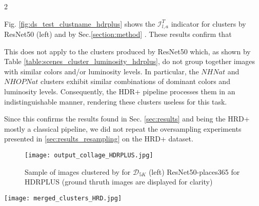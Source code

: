 \documentclass[12pt]{spieman}  %
\begin{document}
\begin{spacing}{2}
\begin{linenumbers}
Fig. \ref{fig:ds_test_clustname_hdrplus}  {shows the $\mathcal{I}^T_{l,a}$ indicator for clusters by ResNet50 (left) and by }  Sec.\ref{section:method}   {. These results confirm that} 

 {This does not apply to the clusters produced by ResNet50 which, as shown by Table } \ref{table:scenes_cluster_luminosity_hdrplus},  { do not group together images with similar colors and/or luminosity levels. In particular,  the $NHNat$ and $NHOPNat$ clusters exhibit similar combinations of dominant colors and luminosity levels. Consequently, the HDR+ pipeline processes them in an indistinguishable manner, rendering these clusters useless for this task.}



 {Since this confirms the results found in Sec.} \ref{sec:results} {and being the HRD+  mostly a classical pipeline, we did not repeat the oversampling experiments presented in} \ref{sec:results_resampling}  {on the HRD+ dataset.}


\begin{figure}[!t]
	\centering
	\texttt{[image: output\_collage\_HDRPLUS.jpg]}
	\caption{Sample of images clustered by \clustname for $\mathcal{D}_{5K}$ (left) ResNet50-places365 for HDRPLUS (ground thruth images are displayed for clarity) }
	\label{fig:clusters_places365_HDRPLUS}
\end{figure}






\begin{figure*}[!t]
	\centering
	\texttt{[image: merged\_clusters\_HRD.jpg]}
	\caption{$\mathcal{I}^T_{l,a}$ for clusters obtained by ResNet50 (left) and by \clustname (right) for HDR+}
	\label{fig:ds_test_clustname_hdrplus}
\end{figure*}





\end{linenumbers}
\end{spacing}
\end{document}
